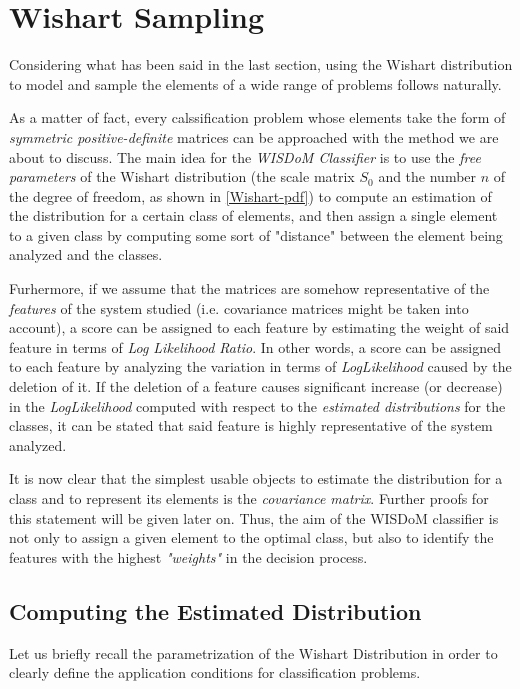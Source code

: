 \documentclass[12pt,openright,twoside,a4paper]{book}
\begin{document}
\section{Wishart Sampling}

Considering what has been said in the last section, using the Wishart distribution to model and sample the elements of a wide range of problems follows naturally.

As a matter of fact, every calssification problem whose elements take the form of \textit{symmetric positive-definite} matrices can be approached with the method we are about to discuss.
The main idea for the \textit{WISDoM Classifier} is to use the \textit{free parameters} of the Wishart distribution (the scale matrix $S_0$ and the number $n$ of the degree of freedom, as shown in \ref{Wishart-pdf}) to compute an estimation of the distribution for a certain class of elements, and then assign a single element to a given class by computing some sort of "distance" between the element being analyzed and the classes.

Furhermore, if we assume that the matrices are somehow representative of the \textit{features} of the system studied (i.e. covariance  matrices might be taken into account), a score can be assigned to each feature by estimating the weight of said feature in terms of \textit{Log Likelihood Ratio}.
In other words, a score can be assigned to each feature by analyzing the variation in terms of \textit{LogLikelihood} caused by the deletion of it. 
If the deletion of a feature causes significant increase (or decrease) in the \textit{LogLikelihood} computed with respect to the \textit{estimated distributions} for the classes, it can be stated that said feature is highly representative of the system analyzed.

It is now clear that the simplest usable objects to estimate the distribution for a class and to represent its elements is the \textit{covariance  matrix}. Further proofs for this statement will be given later on.
Thus, the aim of the WISDoM classifier is not only to assign a given element to the optimal class, but also to identify the features with the highest \textit{"weights"} in the decision process.

\subsection{Computing the Estimated Distribution}

Let us briefly recall the parametrization of the Wishart Distribution in order to clearly define the application conditions for classification problems.
\end{document}
